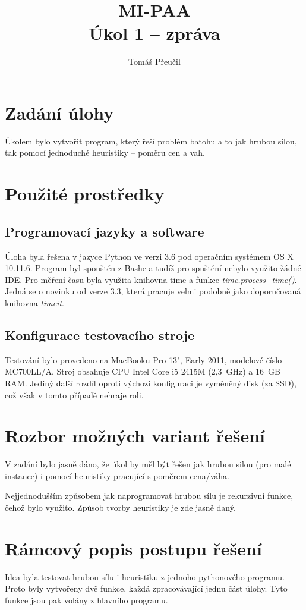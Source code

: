 \documentclass[a4paper]{article}
\title{MI-PAA\\
\large Úkol 1 -- zpráva\\}
\author{Tomáš Přeučil}
\begin{document}
\maketitle


\section{Zadání úlohy}
	Úkolem bylo vytvořit program, který řeší problém batohu a to jak hrubou silou, tak pomocí jednoduché heuristiky -- poměru cen a vah.

\section{Použité prostředky}
	\subsection{Programovací jazyky a software}
		Úloha byla řešena v jazyce Python ve verzi 3.6 pod operačním systémem OS X 10.11.6. Program byl spouštěn z Bashe a tudíž pro spuštění nebylo využito žádné IDE.
		Pro měření času byla využita knihovna time a funkce \textit{time.process\_time()}. Jedná se o novinku od verze 3.3, která pracuje velmi podobně jako doporučovaná knihovna \textit{timeit}.
		
	\subsection{Konfigurace testovacího stroje}
		Testování bylo provedeno na MacBooku Pro 13", Early 2011, modelové číslo MC700LL/A. Stroj obsahuje CPU Intel Core i5 2415M (2,3~GHz) a 16~GB RAM. Jediný další rozdíl oproti výchozí konfiguraci je vyměněný disk (za SSD), což však v tomto případě nehraje roli.

\section{Rozbor možných variant řešení}
	V zadání bylo jasně dáno, že úkol by měl být řešen jak hrubou silou (pro malé instance) i pomocí heuristiky pracující s poměrem cena/váha.
	
	Nejjednodušším způsobem jak naprogramovat hrubou sílu je rekurzivní funkce, čehož bylo využito. Způsob tvorby heuristiky je zde jasně daný.

\section{Rámcový popis postupu řešení}
	Idea byla testovat hrubou sílu i heuristiku z jednoho pythonového programu. Proto byly vytvořeny dvě funkce, každá zpracovávající jednu část úlohy. Tyto funkce jsou pak volány z hlavního programu.
	
\end{document}
